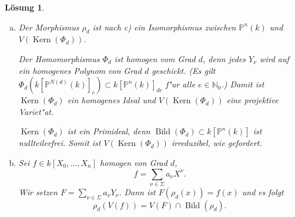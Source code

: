 \documentclass[a4paper, 12pt, numbers=noendperiod, chapterprefix=true, headsepline]{scrbook}
\theoremstyle{break}
\newtheorem{Loes}{L\"osung}
\theoremstyle{nonumberbreak}
\theoremstyle{nonumberplain}
\DeclareMathOperator{\Bild}{Bild}
\DeclareMathOperator{\id}{id}
\DeclareMathOperator{\Kern}{Kern}
\newcommand{\N}{\mathbb{N}}
\newcommand{\IP}{\mathbb{P}}%
\begin{document}
\begin{Loes}
\begin{enumerate}[a)]
	Als n"achstes zeigen wir $\rho_d\circ \psi_d^0 = \id_{U_0}$. Dazu brauchen wir noch eine weitere Relation. F"ur $\nu\in\Sigma$ ist
	\begin{align*}
		\Phi_d({Y_{(d,0,\dots,0)}}^{\nu_0}{Y_{(d-1,1,0,\dots,0)}}^{\nu_1} \cdots {Y_{(d-1,0,\dots,0,1)}}^{\nu_n}) &= X_0^{d\nu_0}X_0^{(d-1)\nu_1}X_1^{\nu_1}\cdots X_0^{(d-1)\nu_n}X_n^{\nu_n}\\
		&= X_0^{(d-1)\sum_{i=0}^n\nu_i}X_0^{\nu_0}X_1^{\nu_1}\cdots X_n^{\nu_n}\\
		&= X_0^{(d-1)d}X^\nu\\
		&= \Phi_d(Y_\nu)\Phi_d({Y_{(d,0,\dots,0)}}^{(d-1)}).
	\end{align*}
	Das bedeutet: F"ur alle $\nu\in \Sigma$ gilt
		\[{Y_{(d,0,\dots,0)}}^{\nu_0}{Y_{(d-1,1,0,\dots,0)}}^{\nu_1} \cdots {Y_{(d-1,0,\dots,0,1)}}^{\nu_n} - Y_{\nu}{Y_{(d,0,\dots,0)}}^{(d-1)}  \in \Kern(\Phi_d).\]
	Damit folgt f"ur $y\in U_0$, d.h. $y_{(d,0,\dots,0)} \neq 0$,
	\begin{align*}
		\rho_d\circ \psi_d^0(y) &= \rho_d(y_{(d,0,\dots,0)}: y_{(d-1,1,0,\dots,0)} : \ldots : y_{(d-1,0,\dots,0,1)})\\
		&= (\ldots : {y_{(d,0,\dots,0)}}^{\nu_0} {y_{(d-1,1,0,\dots,0)}}^{\nu_1} \cdots {y_{(d-1,0,\dots,0,1)}}^{\nu_n}: \ldots)\\
		&= (\ldots : y_\nu {y_{(d,0,\dots,0)}}^{(d-1)}:\ldots ) \stackrel{y_{(d,0,\dots,0)} \neq 0}{=} y.
	\end{align*}
	Auf $U_i\cap U_j$ sind $\psi_d^i$ und $\psi_d^j$ beides Umkehrabbildungen zu $\rho_d$. Wegen der Eindeutigkeit der Umkehrabbildung gilt f"ur alle $y\in U_i\cap U_j$
		\[\psi_d^i(y) = \psi_d^j(y).\]
	Damit verkleben sich die $\psi_d^i$ zu einem Morphismus
		\[\psi_d : V(\Kern(\Phi_d)) \to \IP^n,\]
	der ein Umkehrmorphismus zu $\rho_d$ ist.
\item[d)]
	Der Morphismus $\rho_d$ ist nach c) ein Isomorphismus zwischen $\IP^n(k)$ und $V(\Kern(\Phi_d))$.

	Der Homomorphismus $\Phi_d$ ist homogen vom Grad $d$, denn jedes $Y_\nu$ wird auf ein homogenes Polynom von Grad $d$ geschickt. (Es gilt $\Phi_d(k[\IP^{N(d)}(k)]_e) \subset k[\IP^n(k)]_{de}$ f"ur alle $e\in \N_0$.) Damit ist $\Kern(\Phi_d)$ ein homogenes Ideal und $V(\Kern(\Phi_d))$ eine projektive Variet"at.

	$\Kern(\Phi_d)$ ist ein Primideal, denn $\Bild(\Phi_d)\subset k[\IP^n(k)]$ ist nullteilerfrei. Somit ist $V(\Kern(\Phi_d))$ irreduzibel, wie gefordert. 

\item[e)]
	Sei $f\in k[X_0,\dots,X_n]$ homogen von Grad $d$,
		\[f = \sum_{\nu\in \Sigma} a_\nu X^\nu.\]
	Wir setzen $F = \sum_{\nu\in \Sigma} a_{\nu} Y_\nu$. Dann ist $F(\rho_d(x)) = f(x)$ und es folgt
		\[\rho_d(V(f)) =  V(F)\cap \Bild(\rho_d).\]
\end{enumerate}\end{Loes}
\end{document}
